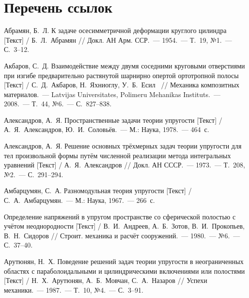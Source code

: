 

\setcounter{secnumdepth}{-1}
\chapter{Перечень ссылок}
\setcounter{secnumdepth}{2}

\renewcommand{\bibliststyle}{\normalsize}
\renewcommand{\bibnumfmt}[1]{#1.\hfill}

\renewcommand{\bibliststyle}{\normalsize}
\renewcommand{\bibnumfmt}[1]{#1.\hfill}

\begin{biblist}{99}\setlength\itemsep{0pt}

Абрамян, Б.~Л. 
К задаче осесимметричной деформации круглого цилиндра [Текст] 
/ Б.~Л.~Абрамян 
// Докл. АН Арм. ССР.~--- 1954.~--- Т.~19, №1.~--- С.~3--12.

Акбаров, С.~Д. 
Взаимодействие между двумя соседними круговыми отверстиями при изгибе предварительно растянутой шарнирно опертой ортотропной полосы [Текст] 
/ С.~Д.~Акбаров, Н.~Яхниоглу, У.~Б.~Есил~
// Механика композитных материалов.~--- Latvijas Universitates, Polimeru Mehanikas Instituts.~--- 2008.~--- Т.~44, №6.~--- С.~827--838.

Александров, А.~Я. 
Пространственные задачи теории упругости [Текст] 
/ А.~Я.~Александров, Ю.~И.~Соловьёв.~--- М.: Наука, 1978.~--- 464~с.

Александров, А.~Я. 
Решение основных трёхмерных задач теории упругости для тел произвольной формы путём численной реализации метода интегральных уравнений [Текст] / А.~Я.~Александров 
// Докл. АН СССР.~--- 1973.~--- Т.~208, №2.~--- С.~291--294.

Амбарцумян, С.~А. 
Разномодульная теория упругости [Текст] 
/ С.~А.~Амбарцумян.~--- М.: Наука, 1967.~--- 266~с.

Определение напряжений в упругом пространстве со сферической полостью с учётом неоднородности [Текст] 
/ В.~И.~Андреев, А.~Б.~Зотов, В.~И.~Прокопьев, В.~Н.~Сидоров 
// Строит. механика и расчёт сооружений.~--- 1980.~--- №6.~--- С.~37--40.

Арутюнян, Н.~Х. 
Поведение решений задач теории упругости в неограниченных областях с параболоидальными и цилиндрическими включениями или полостями [Текст] 
/ Н.~Х.~Арутюнян, А.~Б.~Мовчан, С.~А.~Назаров 
// Успехи механики.~--- 1987.~--- Т.~10, №4.~--- С.~3--91.


\end{biblist}
